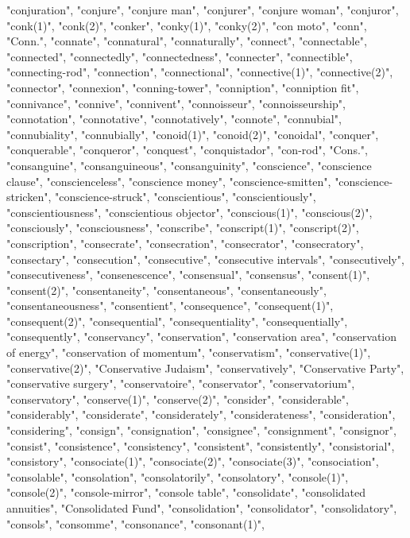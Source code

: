 "conjuration",
"conjure",
"conjure man",
"conjurer",
"conjure woman",
"conjuror",
"conk(1)",
"conk(2)",
"conker",
"conky(1)",
"conky(2)",
"con moto",
"conn",
"Conn.",
"connate",
"connatural",
"connaturally",
"connect",
"connectable",
"connected",
"connectedly",
"connectedness",
"connecter",
"connectible",
"connecting-rod",
"connection",
"connectional",
"connective(1)",
"connective(2)",
"connector",
"connexion",
"conning-tower",
"conniption",
"conniption fit",
"connivance",
"connive",
"connivent",
"connoisseur",
"connoisseurship",
"connotation",
"connotative",
"connotatively",
"connote",
"connubial",
"connubiality",
"connubially",
"conoid(1)",
"conoid(2)",
"conoidal",
"conquer",
"conquerable",
"conqueror",
"conquest",
"conquistador",
"con-rod",
"Cons.",
"consanguine",
"consanguineous",
"consanguinity",
"conscience",
"conscience clause",
"conscienceless",
"conscience money",
"conscience-smitten",
"conscience-stricken",
"conscience-struck",
"conscientious",
"conscientiously",
"conscientiousness",
"conscientious objector",
"conscious(1)",
"conscious(2)",
"consciously",
"consciousness",
"conscribe",
"conscript(1)",
"conscript(2)",
"conscription",
"consecrate",
"consecration",
"consecrator",
"consecratory",
"consectary",
"consecution",
"consecutive",
"consecutive intervals",
"consecutively",
"consecutiveness",
"consenescence",
"consensual",
"consensus",
"consent(1)",
"consent(2)",
"consentaneity",
"consentaneous",
"consentaneously",
"consentaneousness",
"consentient",
"consequence",
"consequent(1)",
"consequent(2)",
"consequential",
"consequentiality",
"consequentially",
"consequently",
"conservancy",
"conservation",
"conservation area",
"conservation of energy",
"conservation of momentum",
"conservatism",
"conservative(1)",
"conservative(2)",
"Conservative Judaism",
"conservatively",
"Conservative Party",
"conservative surgery",
"conservatoire",
"conservator",
"conservatorium",
"conservatory",
"conserve(1)",
"conserve(2)",
"consider",
"considerable",
"considerably",
"considerate",
"considerately",
"considerateness",
"consideration",
"considering",
"consign",
"consignation",
"consignee",
"consignment",
"consignor",
"consist",
"consistence",
"consistency",
"consistent",
"consistently",
"consistorial",
"consistory",
"consociate(1)",
"consociate(2)",
"consociate(3)",
"consociation",
"consolable",
"consolation",
"consolatorily",
"consolatory",
"console(1)",
"console(2)",
"console-mirror",
"console table",
"consolidate",
"consolidated annuities",
"Consolidated Fund",
"consolidation",
"consolidator",
"consolidatory",
"consols",
"consomme",
"consonance",
"consonant(1)",
